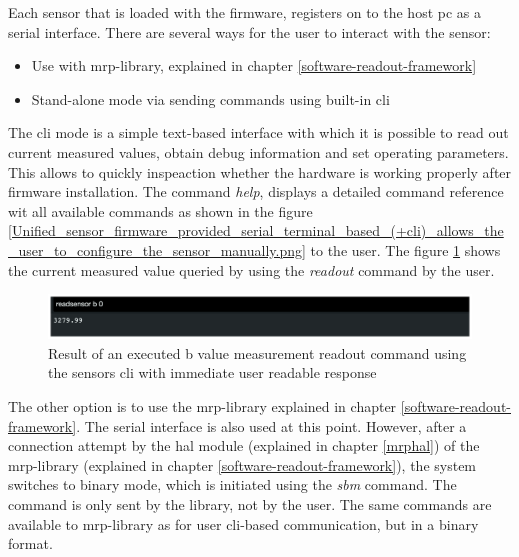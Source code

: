 Each sensor that is loaded with the firmware, registers on to the host
\gls{pc} as a serial interface. There are several ways for the user to
interact with the sensor:

\begin{itemize}
\tightlist
\item
  Use with \gls{mrp}-library, explained in chapter
  \ref{software-readout-framework}
\item
  Stand-alone mode via sending commands using built-in \gls{cli}
\end{itemize}

The \gls{cli} mode is a simple text-based interface with which it is
possible to read out current measured values, obtain debug information
and set operating parameters. This allows to quickly inspeaction whether
the hardware is working properly after firmware installation. The
command \emph{help}, displays a detailed command reference wit all
available commands as shown in the figure
\ref{Unified_sensor_firmware_provided_serial_terminal_based_(+cli)_allows_the_user_to_configure_the_sensor_manually.png}
to the user. The figure
\ref{Result_of_an_executed_b_value_measurement_readout_command_using_the_sensors_(+cli)_with_immediate_user_readable_response.png}
shows the current measured value queried by using the \emph{readout}
command by the user.

\begin{figure}
\centering
\includegraphics{./generated_images/border_Result_of_an_executed_b_value_measurement_readout_command_using_the_sensors_(+cli)_with_immediate_user_readable_response.png}
\caption{Result of an executed b value measurement readout command using
the sensors \gls{cli} with immediate user readable response
\label{Result_of_an_executed_b_value_measurement_readout_command_using_the_sensors_(+cli)_with_immediate_user_readable_response.png}}
\end{figure}

The other option is to use the \gls{mrp}-library explained in chapter
\ref{software-readout-framework}. The serial interface is also used at
this point. However, after a connection attempt by the \gls{hal} module
(explained in chapter \ref{mrphal}) of the \gls{mrp}-library (explained
in chapter \ref{software-readout-framework}), the system switches to
binary mode, which is initiated using the \emph{sbm} command. The
command is only sent by the library, not by the user. The same commands
are available to \gls{mrp}-library as for user \gls{cli}-based
communication, but in a binary format.

